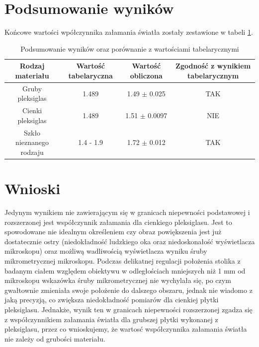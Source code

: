 \documentclass[a4paper,12pts]{article}
\begin{document}
	\section{Podsumowanie wyników}
	Końcowe wartości wpółczynnika załamania światła zostały zestawione w tabeli \ref{podsumowanie_wynikow}.
	\begin{table}[!h]
		\centering
		\begin{tabular}{|c|c|c|c|}
			\hline
			Rodzaj materiału & Wartość tabelaryczna & Wartość obliczona & Zgodność z wynikiem tabelarycznym \\ \hline
			Gruby pleksiglas & 1.489 & 1.49 $\pm$ 0.025 & TAK \\ \hline
			Cienki pleksiglas & 1.489 & 1.51 $\pm$ 0.0097 & NIE \\ \hline
			Szkło nieznanego rodzaju & 1.4 - 1.9 & 1.72 $\pm$ 0.012 & TAK \\ \hline
		\end{tabular}
	\caption{Podsumowanie wyników oraz porównanie z wartościami tabelarycznymi}
	\label{podsumowanie_wynikow}
	\end{table}

	\section{Wnioski}
	Jedynym wynikiem nie zawierającym się w granicach niepewności podstawowej i rozszerzonej jest współczynnik załamania dla cienkiego pleksiglasu. Jest to spowodowane nie idealnym określeniem czy obraz powiększenia jest już dostatecznie ostry (niedokładność ludzkiego oka oraz niedoskonałość wyświetlacza mikroskopu) oraz możliwą wadliwością wyświetlacza wyniku śruby mikrometrycznej mikroskopu. Podczas delikatnej regulacji położenia stolika z badanym ciałem względem obiektywu w odległościach mniejszych niż 1 mm  od mikroskopu wskazówka śruby mikrometrycznej nie wychylała się, po czym gwałtownie zmieniała swoje położenie do dalszego obszaru, jednak nie wiadomo z jaką precyzją, co zwiększa niedokładność pomiarów dla cienkiej płytki pleksiglasu. Jednakże, wynik ten w granicach niepewności rozszerzonej zgadza się z współczynnikiem załamania światła dla grubszej płytki wykonanej z pleksiglasu, przez co wnioskujemy, że wartosć współczynnika załamania światła nie zależy od grubości materiału.
	
\end{document}
